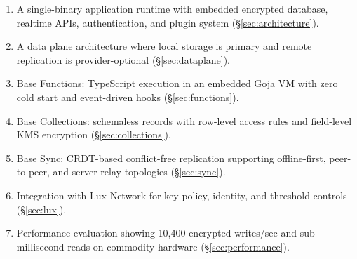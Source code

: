 \begin{enumerate}[leftmargin=1.4em]
    \item A single-binary application runtime with embedded encrypted database,
    realtime APIs, authentication, and plugin system
    (\S\ref{sec:architecture}).
    \item A data plane architecture where local storage is primary and remote
    replication is provider-optional (\S\ref{sec:dataplane}).
    \item Base Functions: TypeScript execution in an embedded Goja VM with
    zero cold start and event-driven hooks (\S\ref{sec:functions}).
    \item Base Collections: schemaless records with row-level access rules and
    field-level KMS encryption (\S\ref{sec:collections}).
    \item Base Sync: CRDT-based conflict-free replication supporting
    offline-first, peer-to-peer, and server-relay topologies
    (\S\ref{sec:sync}).
    \item Integration with Lux Network for key policy, identity, and threshold
    controls (\S\ref{sec:lux}).
    \item Performance evaluation showing 10,400 encrypted writes/sec and
    sub-millisecond reads on commodity hardware (\S\ref{sec:performance}).
\end{enumerate}

